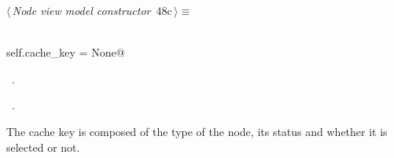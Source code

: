 \documentclass[
    a4paper,      %
    10pt,         %
    openright,    %
    notitlepage,  %
    parskip=half, %
]{scrreprt}       %
\theoremstyle{definition}                    %
\begin{document}
\begin{flushleft} \small
\begin{minipage}{\linewidth}\label{scrap65}\raggedright\small
{} $\langle\,${\itshape Node view model constructor}\nobreak\ {\footnotesize {48c}}$\,\rangle\equiv$
\vspace{-1exm}
\begin{list}{}{} \item
\mbox{}\lstinline@@\\
\mbox{}\lstinline@    self.cache_key = None@\\
\mbox{}\lstinline@@{\NWsep}
\end{list}
\vspace{-1.5ex}
\footnotesize
\begin{list}{}{\setlength{\itemsep}{-\parsep}\setlength{\itemindent}{-\leftmargin}}
\item \NWtxtMacroDefBy\ .
\item \NWtxtMacroRefIn\ .

\item{}
\end{list}
\end{minipage}\vspace{4ex}
\end{flushleft}
The cache key is composed of the type of the node, its status and whether it is
selected or not.
\end{document}
